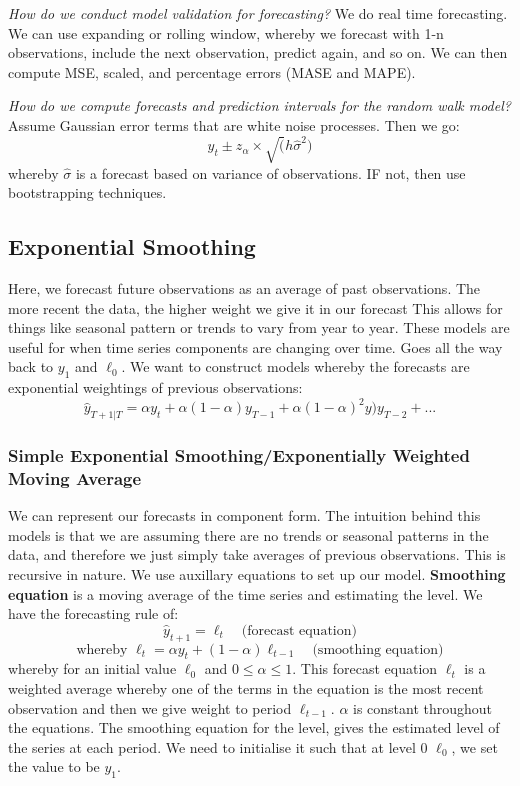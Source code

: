 \documentclass[11pt, oneside]{article}
\theoremstyle{definition}
\begin{document}
\textit{How do we conduct model validation for forecasting?} We do real time forecasting. We can use expanding or rolling window, whereby we forecast with 1-n observations, include the next observation, predict again, and so on. We can then compute MSE, scaled, and percentage errors (MASE and MAPE).

\textit{How do we compute forecasts and prediction intervals for the random walk model?}
Assume Gaussian error terms that are white noise processes. Then we go:
$$
y_t \pm z_{\alpha} \times \sqrt(h\hat{\sigma}^2)
$$
whereby $\hat{\sigma}$ is a forecast based on variance of observations. IF not, then use bootstrapping techniques.

\subsection{Exponential Smoothing}
Here, we forecast future observations as an average of past observations. The more recent the data, the higher weight we give it in our forecast This allows for things like seasonal pattern or trends to vary from year to year. These models are useful for when time series components are changing over time. Goes all the way back to $y_1$ and $\ell_0$. We want to construct models whereby the forecasts are exponential weightings of previous observations:
$$
\hat{y}_{T+1|T} = \alpha y_t + \alpha(1 - \alpha)y_{T-1} + \alpha(1 - \alpha)^2y)y_{T-2} + ...
$$

\subsubsection{Simple Exponential Smoothing/Exponentially Weighted Moving Average}
We can represent our forecasts in component form. The intuition behind this models is that we are assuming there are no trends or seasonal patterns in the data, and therefore we just simply take averages of previous observations. This is recursive in nature. We use auxillary equations to set up our model. \textbf{Smoothing equation} is a moving average of the time series and estimating the level. We have the forecasting rule of:
$$
\hat{y}_{t+1} = \ell_t \quad \text{(forecast equation)}
$$
$$
\text{whereby } \ell_t = \alpha y_t + (1-\alpha)\ell_{t-1} \quad \text{(smoothing equation)}
$$
whereby for an initial value $\ell_0$ and $0 \leq \alpha \leq 1$. This forecast equation $\ell_t$ is a weighted average whereby one of the terms in the equation is the most recent observation and then we give weight to period $\ell_{t-1}$. $\alpha$ is constant throughout the equations. The smoothing equation for the level, gives the estimated level of the series at each period. We need to initialise it such that at level 0 $\ell_0$, we set the value to be $y_1$.
\end{document}
